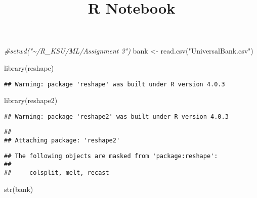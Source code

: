 \documentclass[
]{article}
\title{R Notebook}
\author{}
\date{\vspace{-2.5em}}
\newenvironment{Shaded}{\begin{snugshade}}{\end{snugshade}}
\newcommand{\CommentTok}[1]{\textcolor[rgb]{0.56,0.35,0.01}{\textit{#1}}}
\newcommand{\FunctionTok}[1]{\textcolor[rgb]{0.00,0.00,0.00}{#1}}
\newcommand{\NormalTok}[1]{#1}
\newcommand{\OtherTok}[1]{\textcolor[rgb]{0.56,0.35,0.01}{#1}}
\newcommand{\StringTok}[1]{\textcolor[rgb]{0.31,0.60,0.02}{#1}}
\begin{document}
\maketitle

\begin{Shaded}
\begin{Highlighting}[]
\CommentTok{\#setwd("\textasciitilde{}/R\_KSU/ML/Assignment 3")}
\NormalTok{bank }\OtherTok{\textless{}{-}} \FunctionTok{read.csv}\NormalTok{(}\StringTok{"UniversalBank.csv"}\NormalTok{)}
\end{Highlighting}
\end{Shaded}

\begin{Shaded}
\begin{Highlighting}[]
\FunctionTok{library}\NormalTok{(reshape)}
\end{Highlighting}
\end{Shaded}

\begin{verbatim}
## Warning: package 'reshape' was built under R version 4.0.3
\end{verbatim}

\begin{Shaded}
\begin{Highlighting}[]
\FunctionTok{library}\NormalTok{(reshape2)}
\end{Highlighting}
\end{Shaded}

\begin{verbatim}
## Warning: package 'reshape2' was built under R version 4.0.3
\end{verbatim}

\begin{verbatim}
## 
## Attaching package: 'reshape2'
\end{verbatim}

\begin{verbatim}
## The following objects are masked from 'package:reshape':
## 
##     colsplit, melt, recast
\end{verbatim}

\begin{Shaded}
\begin{Highlighting}[]
\FunctionTok{str}\NormalTok{(bank)}
\end{Highlighting}
\end{Shaded}
\end{document}
